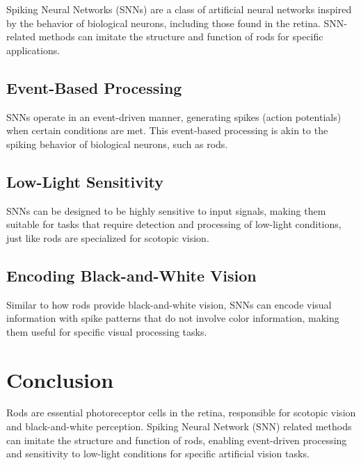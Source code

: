 \documentclass{article}
\begin{document}
Spiking Neural Networks (SNNs) are a class of artificial neural networks inspired by the behavior of biological neurons, including those found in the retina. SNN-related methods can imitate the structure and function of rods for specific applications.

\subsection{Event-Based Processing}

SNNs operate in an event-driven manner, generating spikes (action potentials) when certain conditions are met. This event-based processing is akin to the spiking behavior of biological neurons, such as rods.

\subsection{Low-Light Sensitivity}

SNNs can be designed to be highly sensitive to input signals, making them suitable for tasks that require detection and processing of low-light conditions, just like rods are specialized for scotopic vision.

\subsection{Encoding Black-and-White Vision}

Similar to how rods provide black-and-white vision, SNNs can encode visual information with spike patterns that do not involve color information, making them useful for specific visual processing tasks.

\section{Conclusion}

Rods are essential photoreceptor cells in the retina, responsible for scotopic vision and black-and-white perception. Spiking Neural Network (SNN) related methods can imitate the structure and function of rods, enabling event-driven processing and sensitivity to low-light conditions for specific artificial vision tasks.
\end{document}
